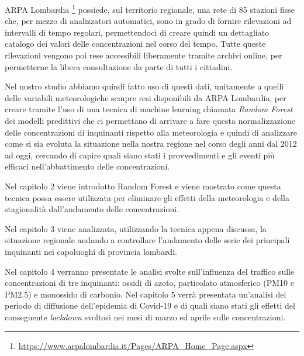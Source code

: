 ARPA Lombardia \footnote{\url{https://www.arpalombardia.it/Pages/ARPA_Home_Page.aspx}}
possiede, sul territorio regionale, una rete di 85 stazioni fisse che, per mezzo di analizzatori automatici, sono in grado di fornire rilevazioni ad intervalli di tempo regolari, permettendoci di creare quindi un dettagliato catalogo dei valori delle concentrazioni nel corso del tempo. Tutte queste rilevazioni vengono poi rese accessibili liberamente tramite archivi online, per permetterne la libera consultazione da parte di tutti i cittadini.  

Nel nostro studio abbiamo quindi fatto uso di questi dati, unitamente a quelli delle variabili meteorologiche sempre resi disponibili da ARPA Lombardia, per creare tramite l'uso di una tecnica di machine learning chiamata \textit{Random Forest} \cite{breiman2001random}
 dei modelli predittivi che ci permettano di arrivare a fare questa normalizzazione delle concentrazioni di inquinanti rispetto alla meteorologia e quindi di analizzare come si sia evoluta la situazione nella nostra regione nel corso degli anni dal 2012 ad oggi, cercando di capire quali siano stati i provvedimenti e gli eventi più efficaci nell'abbattimento delle concentrazioni.  

Nel capitolo 2 viene introdotto Random Forest e viene mostrato come questa tecnica possa essere utilizzata per eliminare gli effetti della meteorologia e della stagionalità dall'andamento delle concentrazioni.  

Nel capitolo 3 viene analizzata, utilizzando la tecnica appena discussa, la situazione regionale andando a controllare l'andamento delle serie dei principali inquinanti nei capoluoghi di provincia lombardi.  

Nel capitolo 4 verranno presentate le analisi svolte sull'influenza del traffico sulle concentrazioni di tre inquinanti: ossidi di azoto, particolato atmosferico (PM10 e PM2.5) e monossido di carbonio.
Nel capitolo 5 verrà presentata un'analisi del periodo di diffusione dell'epidemia di Covid-19 e di quali siano stati gli effetti del conseguente \textit{lockdown} svoltosi nei mesi di marzo ed aprile sulle concentrazioni.

